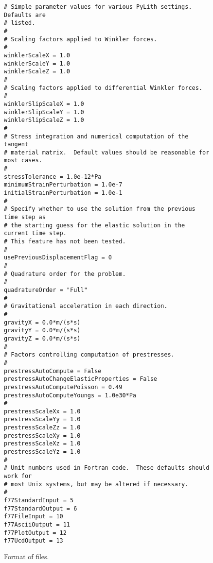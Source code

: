 \begin{figure}
\begin{center}
\begin{verbatim}
# Simple parameter values for various PyLith settings. Defaults are
# listed.
#
# Scaling factors applied to Winkler forces.
#
winklerScaleX = 1.0
winklerScaleY = 1.0
winklerScaleZ = 1.0
#
# Scaling factors applied to differential Winkler forces.
#
winklerSlipScaleX = 1.0
winklerSlipScaleY = 1.0
winklerSlipScaleZ = 1.0
#
# Stress integration and numerical computation of the tangent 
# material matrix.  Default values should be reasonable for most cases.
#
stressTolerance = 1.0e-12*Pa
minimumStrainPerturbation = 1.0e-7
initialStrainPerturbation = 1.0e-1
#
# Specify whether to use the solution from the previous time step as
# the starting guess for the elastic solution in the current time step.
# This feature has not been tested.
#
usePreviousDisplacementFlag = 0
#
# Quadrature order for the problem.
#
quadratureOrder = "Full"
#
# Gravitational acceleration in each direction.
#
gravityX = 0.0*m/(s*s)
gravityY = 0.0*m/(s*s)
gravityZ = 0.0*m/(s*s)
#
# Factors controlling computation of prestresses.
#
prestressAutoCompute = False
prestressAutoChangeElasticProperties = False
prestressAutoComputePoisson = 0.49
prestressAutoComputeYoungs = 1.0e30*Pa
#
prestressScaleXx = 1.0
prestressScaleYy = 1.0
prestressScaleZz = 1.0
prestressScaleXy = 1.0
prestressScaleXz = 1.0
prestressScaleYz = 1.0
#
# Unit numbers used in Fortran code.  These defaults should work for
# most Unix systems, but may be altered if necessary.
#
f77StandardInput = 5
f77StandardOutput = 6
f77FileInput = 10
f77AsciiOutput = 11
f77PlotOutput = 12
f77UcdOutput = 13
\end{verbatim}
  \caption{Format of  files.}
  \end{center}
\end{figure}
